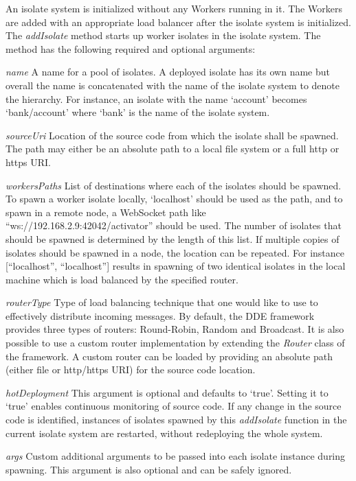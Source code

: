   An isolate system is initialized without any Workers running in it. The Workers are added with an appropriate load balancer after the isolate system is initialized. The \emph{addIsolate} method starts up worker isolates in the isolate system. The method has the following required and optional arguments:
  \begin{description}
    \item{\itshape{name}} \textendash{} A name for a pool of isolates. A deployed isolate has its own name but overall the name is concatenated with the name of the isolate system to denote the hierarchy. For instance, an isolate with the name ‘account’ becomes ‘bank/account’ where ‘bank’ is the name of the isolate system.
    \item{\itshape{sourceUri}} \textendash{} Location of the source code from which the isolate shall be spawned. The path may either be an absolute path to a local file system or a full http or https URI.
    \item{\itshape{workersPaths}} \textendash{} List of destinations where each of the isolates should be spawned. To spawn a worker isolate locally, ‘localhost’ should be used as the path, and to spawn in a remote node, a WebSocket path like “ws://192.168.2.9:42042/activator” should be used. The number of isolates that should be spawned is determined by the length of this list. If multiple copies of isolates should be spawned in a node, the location can be repeated. For instance [“localhost”, “localhost”] results in spawning of two identical isolates in the local machine which is load balanced by the specified router.
    \item{\itshape{routerType}} \textendash{} Type of load balancing technique that one would like to use to effectively distribute incoming messages. By default, the \acrshort{DDE} framework provides three types of routers: Round-Robin, Random and Broadcast. It is also possible to use a custom router implementation by extending the \emph{Router} class of the framework. A custom router can be loaded by providing an absolute path (either file or http/https URI) for the source code location.
    \item{\itshape{hotDeployment}} \textendash{} This argument is optional and defaults to ‘true’. Setting it to ‘true’ enables continuous monitoring of source code. If any change in the source code is identified, instances of isolates spawned by this \emph{addIsolate} function in the current isolate system are restarted, without redeploying the whole system.
    \item{\itshape{args}} \textendash{} Custom additional arguments to be passed into each isolate instance during spawning. This argument is also optional and can be safely ignored.
  \end{description}

